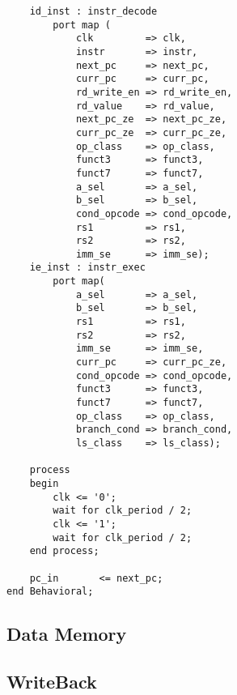 \begin{code}
\begin{verbatim}
    id_inst : instr_decode
        port map (
            clk         => clk,
            instr       => instr, 
            next_pc     => next_pc,
            curr_pc     => curr_pc,
            rd_write_en => rd_write_en,
            rd_value    => rd_value, 
            next_pc_ze  => next_pc_ze,
            curr_pc_ze  => curr_pc_ze,
            op_class    => op_class,
            funct3      => funct3,
            funct7      => funct7,
            a_sel       => a_sel,
            b_sel       => b_sel,
            cond_opcode => cond_opcode,
            rs1         => rs1,
            rs2         => rs2,
            imm_se      => imm_se);
    ie_inst : instr_exec
        port map(
            a_sel       => a_sel,
            b_sel       => b_sel,
            rs1         => rs1,
            rs2         => rs2,
            imm_se      => imm_se,
            curr_pc     => curr_pc_ze,
            cond_opcode => cond_opcode,
            funct3      => funct3,
            funct7      => funct7,
            op_class    => op_class,
            branch_cond => branch_cond,
            ls_class    => ls_class);
        
    process
    begin
        clk <= '0';
        wait for clk_period / 2;
        clk <= '1';
        wait for clk_period / 2;
    end process;

    pc_in       <= next_pc;
end Behavioral;
\end{verbatim}
\end{code}
\newpage


\subsection{Data Memory}

\subsection{WriteBack}